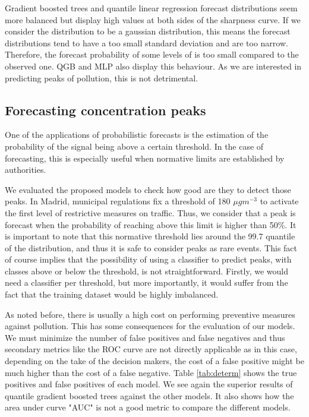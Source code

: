 \documentclass[a4paper,3p,sort&compress]{elsarticle}
\begin{document}
Gradient boosted trees and quantile linear regression forecast
distributions seem more balanced but display high values at both sides
of the sharpness curve.  If we consider the distribution to be a
gaussian distribution, this means the forecast distributions tend to
have a too small standard deviation and are too narrow. Therefore, the
forecast probability of some levels of \no is too
small compared to the observed one. QGB and MLP also display this behaviour.
As we are interested in predicting peaks of pollution, 
this is not detrimental.

\subsection{Forecasting \no concentration peaks}

One of the applications of probabilistic forecasts is the estimation
of the probability of the signal being above a certain threshold. In
the case of \no forecasting, this is especially useful when normative
limits are established by authorities.

We evaluated the proposed models to check how good are they to detect
those peaks.  In Madrid, municipal regulations fix a threshold of 180
$\mu gm^{-3}$ to activate the first level of restrictive measures on
traffic. Thus, we consider that a \no peak is forecast when the
probability of reaching above this limit is higher than 50\%.  It is
important to note that this normative threshold lies around the 99.7
quantile of the \no distribution, and thus it is safe to consider
peaks as rare events.
This fact of course implies that the possibility of using a classifier
to predict peaks, with classes above or below the threshold, is not
straightforward. Firstly, we would need a classifier per threshold,
but more importantly, it would suffer from the fact that the training
dataset would be highly imbalanced.

As noted before, there is usually a high cost on performing preventive
measures against pollution. This has some consequences for the
evaluation of our models. We must minimize the number of false
positives and false negatives and thus secondary metrics like the ROC
curve are not directly applicable as in this case, depending on the
take of the decision makers, the cost of a false positive might be
much higher than the cost of a false negative. 
Table
\ref{tab:determ} shows the true positives and false positives
of each model. We see again the superior results of quantile gradient
boosted trees against the other models. It also shows how the area under curve 
"AUC" is not a good metric to compare the different models.
\end{document}

